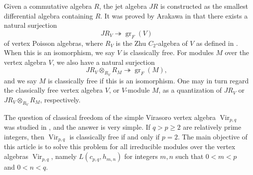 \documentclass[a4paper, 12pt, reqno]{amsart}
\theoremstyle{remark}
\DeclareMathOperator{\Vir}{Vir}
\DeclareMathOperator{\gr}{gr}
\begin{document}
Given a commutative algebra $R$, the jet algebra $JR$ is constructed as the smallest differential algebra containing $R$. It was proved by Arakawa in \cite[Proposition 2.5.1]{arakawa_remark_2012} that there exists a natural surjection
\begin{equation*}
  JR_V \twoheadrightarrow \gr_F(V)
\end{equation*}
of vertex Poisson algebras, where $R_V$ is the Zhu $C_2$-algebra of $V$ as defined in \cite{zhu_modular_1996}.
When this is an isomorphism, we say $V$ is classically free.
For modules $M$ over the vertex algebra $V$, we also have a natural surjection
\begin{equation*}
  JR_V \otimes_{R_V} R_M \twoheadrightarrow \gr_F(M),
\end{equation*}
and we say $M$ is classically free if this is an isomorphism. One may in turn regard the classically free vertex algebra $V$, or $V$-module $M$, as a quantization of $JR_V$ or $JR_V \otimes_{R_V} R_M$, respectively.

The question of classical freedom of the simple Virasoro vertex algebra $\Vir_{p, q}$ was studied in \cite{van_ekeren_chiral_2021}, and the answer is very simple.
If $q > p \ge 2$ are relatively prime integers, then $\Vir_{p, q}$ is classically free if and only if $p = 2$.
The main objective of this article is to solve this problem for all irreducible modules over the vertex algebras $\Vir_{p, q}$, namely $L(c_{p, q}, h_{m, n})$ for integers $m, n$ such that $0 < m < p$ and $0 < n < q$.
\end{document}
